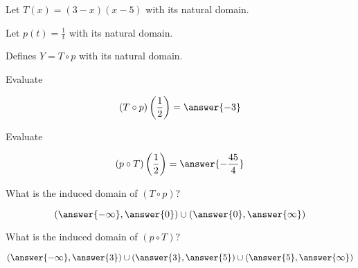 \documentclass{ximera}
\begin{document}
\begin{example}



Let $T(x) = (3-x)(x-5)$ with its natural domain.


Let $p(t) = \frac{1}{t}$ with its natural domain.


Defines $Y = T \circ p$ with its natural domain.



\begin{question}

Evaluate


\[
(T \circ p)\left( \frac{1}{2} \right) = \answer{-3}
\]



\end{question}






\begin{question}

Evaluate


\[
(p \circ T)\left( \frac{1}{2} \right) = \answer{-\frac{45}{4}}
\]



\end{question}





\begin{question}

What is the induced domain of $(T \circ p)$?


\[
\left( \answer{-\infty}, \answer{0}  \right) \cup \left( \answer{0}, \answer{\infty}  \right)
\]



\end{question}








\begin{question}

What is the induced domain of $(p \circ T)$?


\[
\left( \answer{-\infty}, \answer{3}  \right) \cup \left( \answer{3}, \answer{5}  \right)  \cup \left( \answer{5}, \answer{\infty}  \right)
\]



\end{question}







\end{example}
\end{document}
